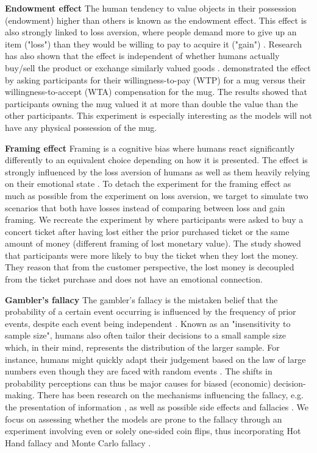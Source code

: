 \par \textbf{Endowment effect} The human tendency to value objects in their possession (endowment) higher than others is known as the endowment effect. This effect is also strongly linked to loss aversion, where people demand more to give up an item ("loss") than they would be willing to pay to acquire it ("gain") \parencite{kahneman1990experimental}. Research has also shown that the effect is independent of whether humans actually buy/sell the product or exchange similarly valued goods \parencite{knetsch1989endowment}. \textcite{kahneman1990experimental} demonstrated the effect by asking participants for their willingness-to-pay (WTP) for a mug versus their willingness-to-accept (WTA) compensation for the mug. The results showed that participants owning the mug valued it at more than double the value than the other participants. This experiment is especially interesting as the models will not have any physical possession of the mug.

\par \textbf{Framing effect} Framing is a cognitive bias where humans react significantly differently to an equivalent choice depending on how it is presented. The effect is strongly influenced by the loss aversion of humans as well as them heavily relying on their emotional state \parencite{tversky1981framing}. To detach the experiment for the framing effect as much as possible from the experiment on loss aversion, we target to simulate two scenarios that both have losses instead of comparing between loss and gain framing. We recreate the experiment by \textcite{tversky1981framing} where participants were asked to buy a concert ticket after having lost either the prior purchased ticket or the same amount of money (different framing of lost monetary value). The study showed that participants were more likely to buy the ticket when they lost the money. They reason that from the customer perspective, the lost money is decoupled from the ticket purchase and does not have an emotional connection.

\par \textbf{Gambler's fallacy} The gambler's fallacy is the mistaken belief that the probability of a certain event occurring is influenced by the frequency of prior events, despite each event being independent \parencite{bar1991perception,kovic2019gambler}. Known as an "insensitivity to sample size", humans also often tailor their decisions to a small sample size which, in their mind, represents the distribution of the larger sample. For instance, humans might quickly adapt their judgement based on the law of large numbers even though they are faced with random events \parencite{tversky1974judgment}. The shifts in probability perceptions can thus be major causes for biased (economic) decision-making. There has been research on the mechanisms influencing the fallacy, e.g. the presentation of information \parencite{barron2010role}, as well as possible side effects and fallacies \parencite{kovic2019gambler}. We focus on assessing whether the models are prone to the fallacy through an experiment involving even or solely one-sided coin flips, thus incorporating Hot Hand fallacy and Monte Carlo fallacy \parencite{leonard2015gambling}.

